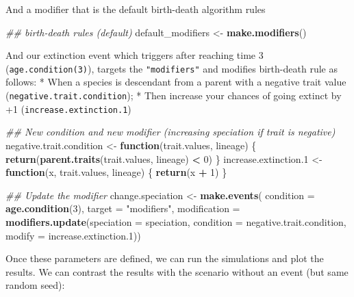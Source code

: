 \documentclass[
]{book}
\newenvironment{Shaded}{\begin{snugshade}}{\end{snugshade}}
\newcommand{\CommentTok}[1]{\textcolor[rgb]{0.56,0.35,0.01}{\textit{#1}}}
\newcommand{\ControlFlowTok}[1]{\textcolor[rgb]{0.13,0.29,0.53}{\textbf{#1}}}
\newcommand{\DataTypeTok}[1]{\textcolor[rgb]{0.13,0.29,0.53}{#1}}
\newcommand{\DecValTok}[1]{\textcolor[rgb]{0.00,0.00,0.81}{#1}}
\newcommand{\FloatTok}[1]{\textcolor[rgb]{0.00,0.00,0.81}{#1}}
\newcommand{\KeywordTok}[1]{\textcolor[rgb]{0.13,0.29,0.53}{\textbf{#1}}}
\newcommand{\NormalTok}[1]{#1}
\newcommand{\OperatorTok}[1]{\textcolor[rgb]{0.81,0.36,0.00}{\textbf{#1}}}
\newcommand{\StringTok}[1]{\textcolor[rgb]{0.31,0.60,0.02}{#1}}
\begin{document}
And a modifier that is the default birth-death algorithm rules

\begin{Shaded}
\begin{Highlighting}[]
\CommentTok{\#\# birth{-}death rules (default)}
\NormalTok{default\_modifiers \textless{}{-}}\StringTok{ }\KeywordTok{make.modifiers}\NormalTok{()}
\end{Highlighting}
\end{Shaded}

And our extinction event which triggers after reaching time 3 (\texttt{age.condition(3)}), targets the \texttt{"modifiers"} and modifies birth-death rule as follows:
* When a species is descendant from a parent with a negative trait value (\texttt{negative.trait.condition});
* Then increase your chances of going extinct by +1 (\texttt{increase.extinction.1})

\begin{Shaded}
\begin{Highlighting}[]
\CommentTok{\#\# New condition and new modifier (increasing speciation if trait is negative)}
\NormalTok{negative.trait.condition \textless{}{-}}\StringTok{ }\ControlFlowTok{function}\NormalTok{(trait.values, lineage) \{}
    \KeywordTok{return}\NormalTok{(}\KeywordTok{parent.traits}\NormalTok{(trait.values, lineage) }\OperatorTok{\textless{}}\StringTok{ }\DecValTok{0}\NormalTok{)}
\NormalTok{\}}
\NormalTok{increase.extinction}\FloatTok{.1}\NormalTok{ \textless{}{-}}\StringTok{ }\ControlFlowTok{function}\NormalTok{(x, trait.values, lineage) \{}
  \KeywordTok{return}\NormalTok{(x }\OperatorTok{+}\StringTok{ }\DecValTok{1}\NormalTok{)}
\NormalTok{\}}

\CommentTok{\#\# Update the modifier}
\NormalTok{change.speciation \textless{}{-}}\StringTok{ }\KeywordTok{make.events}\NormalTok{(}
    \DataTypeTok{condition    =} \KeywordTok{age.condition}\NormalTok{(}\DecValTok{3}\NormalTok{),}
    \DataTypeTok{target       =} \StringTok{"modifiers"}\NormalTok{,}
    \DataTypeTok{modification =} \KeywordTok{modifiers.update}\NormalTok{(}\DataTypeTok{speciation =}\NormalTok{ speciation,}
                                    \DataTypeTok{condition  =}\NormalTok{ negative.trait.condition,}
                                    \DataTypeTok{modify     =}\NormalTok{ increase.extinction}\FloatTok{.1}\NormalTok{))}
\end{Highlighting}
\end{Shaded}

Once these parameters are defined, we can run the simulations and plot the results.
We can contrast the results with the scenario without an event (but same random seed):
\end{document}
